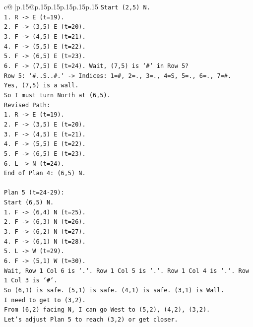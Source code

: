 \documentclass{article}
\begin{document}
{\begin{supertabular}{c@{$\;$}|p{.15\linewidth}@{}p{.15\linewidth}p{.15\linewidth}p{.15\linewidth}p{.15\linewidth}p{.15\linewidth}}
{{{\texttt{Start (2,5) N.} \\
\texttt{1. R {-}> E (t=19).} \\
\texttt{2. F {-}> (3,5) E (t=20).} \\
\texttt{3. F {-}> (4,5) E (t=21).} \\
\texttt{4. F {-}> (5,5) E (t=22).} \\
\texttt{5. F {-}> (6,5) E (t=23).} \\
\texttt{6. F {-}> (7,5) E (t=24). Wait, (7,5) is `\#` in Row 5?} \\
\texttt{Row 5: `\#..S..\#.` {-}> Indices: 1=\#, 2=., 3=., 4=S, 5=., 6=., 7=\#.} \\
\texttt{Yes, (7,5) is a wall.} \\
\texttt{So I must turn North at (6,5).} \\
\texttt{Revised Path:} \\
\texttt{1. R {-}> E (t=19).} \\
\texttt{2. F {-}> (3,5) E (t=20).} \\
\texttt{3. F {-}> (4,5) E (t=21).} \\
\texttt{4. F {-}> (5,5) E (t=22).} \\
\texttt{5. F {-}> (6,5) E (t=23).} \\
\texttt{6. L {-}> N (t=24).} \\
\texttt{End of Plan 4: (6,5) N.} \\
\\ 
\texttt{Plan 5 (t=24{-}29):} \\
\texttt{Start (6,5) N.} \\
\texttt{1. F {-}> (6,4) N (t=25).} \\
\texttt{2. F {-}> (6,3) N (t=26).} \\
\texttt{3. F {-}> (6,2) N (t=27).} \\
\texttt{4. F {-}> (6,1) N (t=28).} \\
\texttt{5. L {-}> W (t=29).} \\
\texttt{6. F {-}> (5,1) W (t=30).} \\
\texttt{Wait, Row 1 Col 6 is `.`. Row 1 Col 5 is `.`. Row 1 Col 4 is `.`. Row 1 Col 3 is `\#`.} \\
\texttt{So (6,1) is safe. (5,1) is safe. (4,1) is safe. (3,1) is Wall.} \\
\texttt{I need to get to (3,2).} \\
\texttt{From (6,2) facing N, I can go West to (5,2), (4,2), (3,2).} \\
\texttt{Let's adjust Plan 5 to reach (3,2) or get closer.} \\
}}}
\end{supertabular}}
\end{document}
